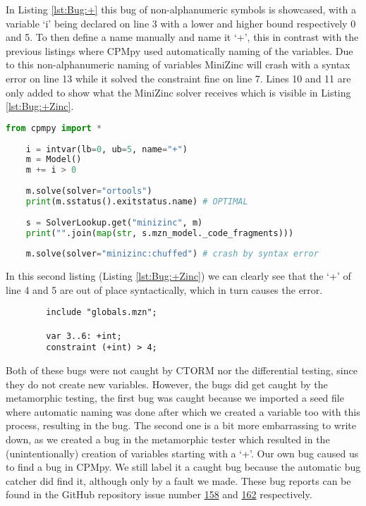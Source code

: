 In Listing \ref{lst:Bug:+} this bug of non-alphanumeric symbols is showcased, with a variable ‘i’ being declared on line 3 with a lower and higher bound respectively 0 and 5. To then define a name manually and name it ‘+’, this in contrast with the previous listings where CPMpy used automatically naming of the variables. Due to this non-alphanumeric naming of variables MiniZinc will crash with a syntax error on line 13 while it solved the constraint fine on line 7. Lines 10 and 11 are only added to show what the MiniZinc solver receives which is visible in Listing \ref{lst:Bug:+Zinc}. 

\begin{lstlisting}[language=python, label={lst:Bug:+}, caption={A bug showcasing that the naming of CPMpy’s variables is less strict than MiniZinc’s naming.}]
	from cpmpy import *
	
	i = intvar(lb=0, ub=5, name="+")
	m = Model()
	m += i > 0
	
	m.solve(solver="ortools")
	print(m.sstatus().exitstatus.name) # OPTIMAL
	
	s = SolverLookup.get("minizinc", m)
	print("".join(map(str, s.mzn_model._code_fragments)))
	
	m.solve(solver="minizinc:chuffed") # crash by syntax error
\end{lstlisting}

\noindent In this second listing (Listing \ref{lst:Bug:+Zinc}) we can clearly see that the ‘+’ of line 4 and 5 are out of place syntactically, which in turn causes the error.

\begin{lstlisting}[language=minizinc, label={lst:Bug:+Zinc}, caption={The resulting Zinc code from Listing \ref{lst:Bug:+} used by Minzinc.}]
		% Generated by CPMpy
		include "globals.mzn";
		
		var 3..6: +int;
		constraint (+int) > 4;
\end{lstlisting}

Both of these bugs were not caught by CTORM nor the differential testing, since they do not create new variables. However, the bugs did get caught by the metamorphic testing, the first bug was caught because we imported a seed file where automatic naming was done after which we created a variable too with this process, resulting in the bug. The second one is a bit more embarrassing to write down, as we created a bug in the metamorphic tester which resulted in the (unintentionally) creation of variables starting with a ‘+’. Our own bug caused us to find a bug in CPMpy. We still label it a caught bug because the automatic bug catcher did find it, although only by a fault we made. These bug reports can be found in the GitHub repository issue number \href{https://github.com/CPMpy/cpmpy/issues/158}{158} and \href{https://github.com/CPMpy/cpmpy/issues/162}{162} respectively.


